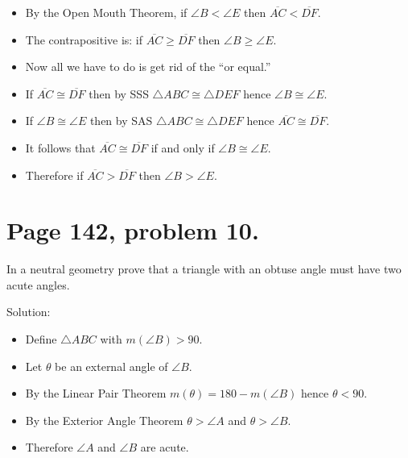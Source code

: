 \documentclass[12pt,openany]{report}
\begin{document}
\begin{itemize}

\item[]
By the Open Mouth Theorem, if $\angle B<\angle E$ then $\overline{AC}<\overline{DF}$.

\item[]
The contrapositive is: if $\overline{AC}\ge\overline{DF}$ then $\angle B\ge\angle E$.

\item[]
Now all we have to do is get rid of the ``or equal.''
\item[]
If $\overline{AC}\cong\overline{DF}$ then by SSS $\triangle ABC\cong\triangle DEF$
hence $\angle B\cong\angle E$.

\item[]
If $\angle B\cong\angle E$ then by SAS $\triangle ABC\cong\triangle DEF$
hence $\overline{AC}\cong\overline{DF}$.

\item[]
It follows that $\overline{AC}\cong\overline{DF}$ if and only if $\angle B\cong\angle E$.

\item[]
Therefore if $\overline{AC}>\overline{DF}$ then $\angle B>\angle E$.

\end{itemize}

\newpage

\section*{Page 142, problem 10.}

In a neutral geometry prove that a triangle with an obtuse angle must have
two acute angles.

\bigskip
\noindent
Solution:

\begin{itemize}

\item[]
Define $\triangle ABC$ with $m(\angle B)>90$.

\item[]
Let $\theta$ be an external angle of $\angle B$.

\item[]
By the Linear Pair Theorem $m(\theta)=180-m(\angle B)$ hence $\theta<90$.

\item[]
By the Exterior Angle Theorem $\theta>\angle A$ and $\theta>\angle B$.

\item[]
Therefore $\angle A$ and $\angle B$ are acute.

\end{itemize}
\end{document}
